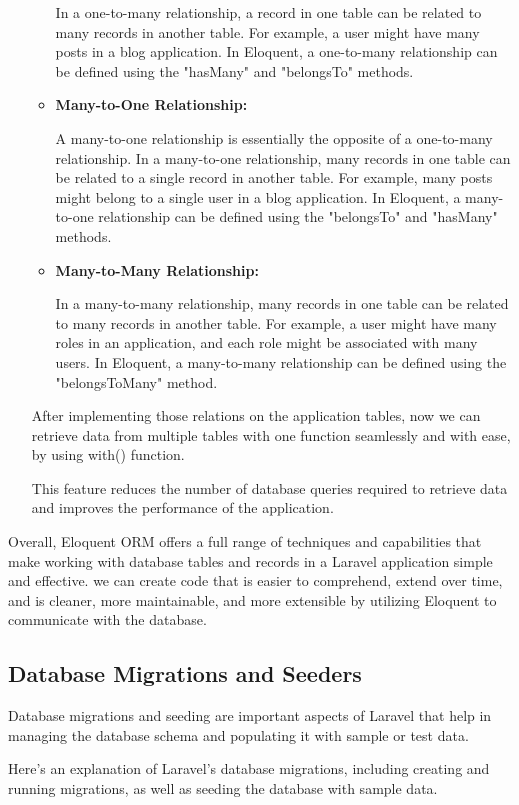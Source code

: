 \begin{itemize}
\begin{itemize}
    In a one-to-many relationship, a record in one table can be related to many records in another table. For example, a user might have many posts in a blog application. In Eloquent, a one-to-many relationship can be defined using the "hasMany" and "belongsTo" methods.
    \item \textbf{Many-to-One Relationship:}
    
    A many-to-one relationship is essentially the opposite of a one-to-many relationship. In a many-to-one relationship, many records in one table can be related to a single record in another table. For example, many posts might belong to a single user in a blog application. In Eloquent, a many-to-one relationship can be defined using the "belongsTo" and "hasMany" methods.
    \item \textbf{Many-to-Many Relationship:}
    
    In a many-to-many relationship, many records in one table can be related to many records in another table. For example, a user might have many roles in an application, and each role might be associated with many users. In Eloquent, a many-to-many relationship can be defined using the "belongsToMany" method.
\end{itemize}
After implementing those relations on the application tables, now we can retrieve data from multiple tables with one function seamlessly and with ease, by using with() function.

This feature reduces the number of database queries required to retrieve data and improves the performance of the application.
\end{itemize}
Overall, Eloquent ORM offers a full range of techniques and capabilities that make working with database tables and records in a Laravel application simple and effective. we can create code that is easier to comprehend, extend over time, and is cleaner, more maintainable, and more extensible by utilizing Eloquent to communicate with the database.
\subsection{Database Migrations and Seeders}
Database migrations and seeding are important aspects of Laravel that help in managing the database schema and populating it with sample or test data. 

Here's an explanation of Laravel's database migrations, including creating and running migrations, as well as seeding the database with sample data.

